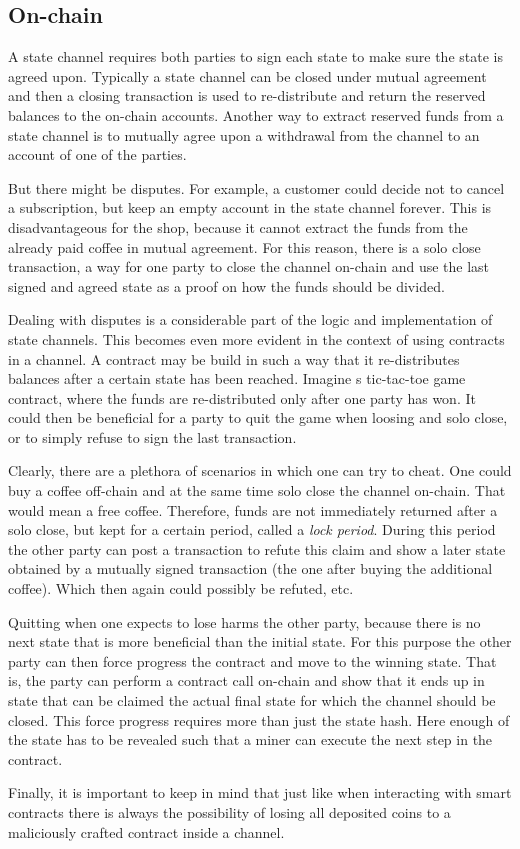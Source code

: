 \subsection{On-chain}

A state channel requires both parties to sign each state to make
sure the state is agreed upon. Typically a state channel can be closed
under mutual agreement and then a closing transaction is used to
re-distribute and return the reserved balances to the on-chain
accounts. Another way to extract reserved funds from a state channel
is to mutually agree upon a withdrawal from the channel to an account of
one of the parties.

But there might be disputes. For example, a customer
could decide not to cancel a subscription, but keep an empty account
in the state channel forever. This is disadvantageous for the shop,
because it cannot extract the funds from the already paid coffee in
mutual agreement. For this reason, there is a solo close transaction,
a way for one party to close the channel on-chain and use the last
signed and agreed state as a proof on how the funds should be divided.

Dealing with disputes is a considerable part of the logic and
implementation of state channels. This becomes even more evident in
the context of using contracts in a channel. A contract may be build
in such a way that it re-distributes balances after a certain state has
been reached. Imagine s tic-tac-toe game contract, where the funds are
re-distributed only after one party has won. It could then be beneficial for a
party to quit the game when loosing and solo close, or to simply refuse to sign
the last transaction.

Clearly, there are a plethora of scenarios in which one can try to
cheat. One could buy a coffee off-chain and at the same time solo
close the channel on-chain. That would mean a free coffee. Therefore,
funds are not immediately returned after a solo close, but kept for a
certain period, called a \textit{lock period}. During this period the
other party can post a transaction to refute this claim and show a
later state obtained by a mutually signed transaction (the one after
buying the additional coffee). Which then again could possibly be
refuted, etc.

Quitting when one expects to lose
harms the other party, because there is no next state that is more
beneficial than the initial state. For this purpose the other party
can then force progress the contract and move to the winning
state. That is, the party can perform a contract call on-chain and show that it
ends up in state that can be claimed the actual final state for which
the channel should be closed. This force progress requires more than
just the state hash. Here enough of the state has to be revealed such that a
miner can execute the next step in the contract.

Finally, it is important to keep in mind that just like when interacting with
smart contracts there is always the possibility of losing all deposited coins
to a maliciously crafted contract inside a channel.

